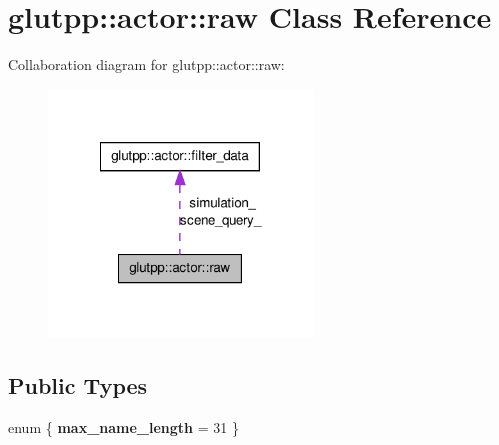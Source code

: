 \hypertarget{classglutpp_1_1actor_1_1raw}{\section{glutpp\-:\-:actor\-:\-:raw \-Class \-Reference}
\label{classglutpp_1_1actor_1_1raw}
}


\-Collaboration diagram for glutpp\-:\-:actor\-:\-:raw\-:\nopagebreak
\begin{figure}[H]
\begin{center}
\leavevmode
\includegraphics[width=200pt]{classglutpp_1_1actor_1_1raw__coll__graph}
\end{center}
\end{figure}
\subsection*{\-Public \-Types}
\begin{DoxyCompactItemize}
\item 
enum \{ {\bfseries max\-\_\-name\-\_\-length} =  31
 \}
\end{DoxyCompactItemize}
